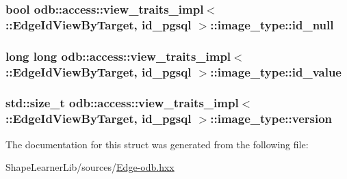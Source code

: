 \subsubsection[{id\+\_\+null}]{\setlength{\rightskip}{0pt plus 5cm}bool odb\+::access\+::view\+\_\+traits\+\_\+impl$<$ \+::{\bf Edge\+Id\+View\+By\+Target}, id\+\_\+pgsql $>$\+::image\+\_\+type\+::id\+\_\+null}\label{structodb_1_1access_1_1view__traits__impl_3_01_1_1_edge_id_view_by_target_00_01id__pgsql_01_4_1_1image__type_a6764e7d11ee80834fea94dd7e7105c58}
\hypertarget{structodb_1_1access_1_1view__traits__impl_3_01_1_1_edge_id_view_by_target_00_01id__pgsql_01_4_1_1image__type_a31acb9194dbdef47eca49ca30a4efbc6}{}
\subsubsection[{id\+\_\+value}]{\setlength{\rightskip}{0pt plus 5cm}long long odb\+::access\+::view\+\_\+traits\+\_\+impl$<$ \+::{\bf Edge\+Id\+View\+By\+Target}, id\+\_\+pgsql $>$\+::image\+\_\+type\+::id\+\_\+value}\label{structodb_1_1access_1_1view__traits__impl_3_01_1_1_edge_id_view_by_target_00_01id__pgsql_01_4_1_1image__type_a31acb9194dbdef47eca49ca30a4efbc6}
\hypertarget{structodb_1_1access_1_1view__traits__impl_3_01_1_1_edge_id_view_by_target_00_01id__pgsql_01_4_1_1image__type_a5972b53d9e6f62e0619d54b5e5aa2b3a}{}
\subsubsection[{version}]{\setlength{\rightskip}{0pt plus 5cm}std\+::size\+\_\+t odb\+::access\+::view\+\_\+traits\+\_\+impl$<$ \+::{\bf Edge\+Id\+View\+By\+Target}, id\+\_\+pgsql $>$\+::image\+\_\+type\+::version}\label{structodb_1_1access_1_1view__traits__impl_3_01_1_1_edge_id_view_by_target_00_01id__pgsql_01_4_1_1image__type_a5972b53d9e6f62e0619d54b5e5aa2b3a}


The documentation for this struct was generated from the following file\+:\begin{DoxyCompactItemize}
\item 
Shape\+Learner\+Lib/sources/\hyperlink{_edge-odb_8hxx}{Edge-\/odb.\+hxx}\end{DoxyCompactItemize}
